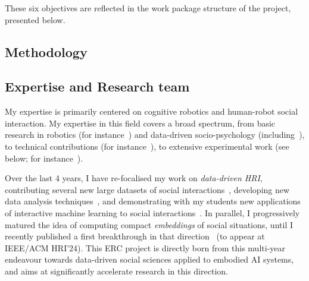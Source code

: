 These six objectives are reflected in the work package structure of the project,
presented below.



\subsection{Methodology}







\subsection{Expertise and Research team}
\label{research-team}

My expertise is primarily centered on cognitive robotics and human-robot social
interaction. My expertise in this field covers a broad spectrum, from basic
research in robotics (for
instance~\cite{lemaignan2014dynamics,lemaignan2015mutual}) and data-driven
socio-psychology
(including~\cite{lemaignan2014cognitive,irfan2018social,winkle2019effective,bartlett2019what}),
to technical contributions (for instance~\cite{lemaignan2010oro,
lemaignan2017artificial, lemaignan2018underworlds}), to extensive experimental
work (see below; for instance~\cite{hood2015cowriter,winkle2020couch,
lemaignan2022social}).

Over the last 4 years, I have re-focalised my work on \emph{data-driven HRI},
contributing several new large datasets of social
interactions~\cite{lemaignan2018pinsoro,sallami2020unexpected,webb2023sogrin},
developing new data analysis
techniques~\cite{bartlett2019what,webb2022measuring}, and demonstrating with my
students new applications of interactive machine learning to social
interactions~\cite{senft2016sparc,winkle2020couch,winkle2021leador}.  In
parallel, I progressively matured the idea of computing compact
\emph{embeddings} of social situations, until I recently published a first
breakthrough in that direction~\cite{lemaignan2024social} (to appear at IEEE/ACM
HRI'24). This ERC project is directly born from this multi-year endeavour
towards data-driven social sciences applied to embodied AI systems, and aims at
significantly accelerate research in this direction.

